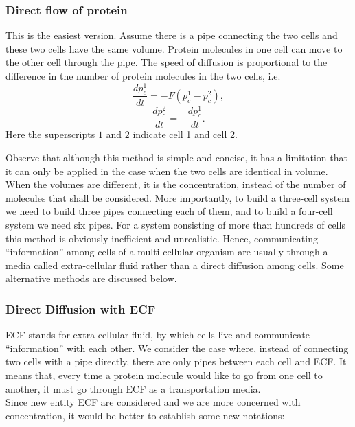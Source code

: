 \documentclass[12pt]{article}
\renewcommand{\(}{\left (}
\renewcommand{\)}{\right )}
\begin{document}
\subsubsection{Direct flow of protein}
\hspace{5mm} This is the easiest version. Assume there is a pipe connecting the two cells and these two cells have the same volume. Protein molecules in one cell can move to the other cell through the pipe. The speed of diffusion is proportional to the difference in the number of protein molecules in the two cells, i.e.
\begin{equation}
	\frac{d {p_c^1}}{dt} = -F ({p_c^1 - p_c^2}),
\end{equation}
\begin{equation}
	\frac{d {p_c^2}}{dt} = -\frac{d {p_c^1}}{dt}.
\end{equation}
Here the superscripts $1$ and $2$ indicate cell 1 and cell 2.

Observe that although this method is simple and concise, it has a limitation that it can only be applied in the case when the two cells are identical in volume. When the volumes are different, it is the concentration, instead of the number of molecules that shall be considered. More importantly, to build a three-cell system we need to build three pipes connecting each of them, and to build a four-cell system we need six pipes. For a system consisting of more than hundreds of cells this method is obviously inefficient and unrealistic. Hence, communicating ``information'' among cells of a multi-cellular organism are usually through a media called extra-cellular fluid rather than a direct diffusion among cells. Some alternative methods are discussed below.

\subsubsection{Direct Diffusion with ECF}
\hspace{5mm} ECF stands for extra-cellular fluid, by which cells live and communicate ``information'' with each other. We consider the case where, instead of connecting two cells with a pipe directly, there are only pipes between each cell and ECF. It means that, every time a protein molecule would like to go from one cell to another, it must go through ECF as a transportation media. \\

Since new entity ECF are considered and we are more concerned with concentration, it would be better to establish some new notations: \\
\end{document}
